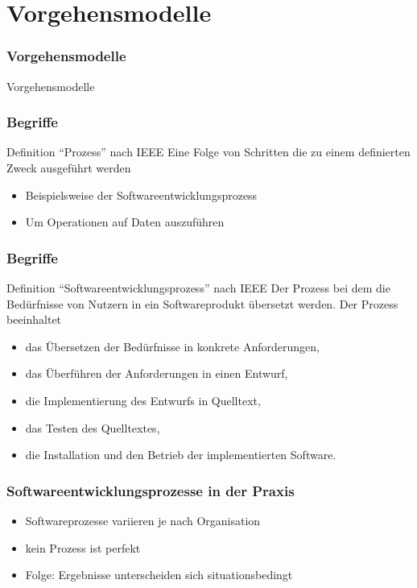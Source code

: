 \section{Vorgehensmodelle}
\begin{frame}[fragile]
\frametitle{Vorgehensmodelle}
\huge Vorgehensmodelle
\end{frame}

\begin{frame}
\frametitle{Begriffe}
	\begin{block}{Definition ``Prozess'' nach IEEE}
		Eine Folge von Schritten die zu einem definierten Zweck ausgeführt werden
		\begin{itemize}
			\item Beispielsweise der Softwareentwicklungsprozess
			\item Um Operationen auf Daten auszuführen
		\end{itemize}
	\end{block}
\end{frame}

\begin{frame}
\frametitle{Begriffe}
	\begin{block}{Definition ``Softwareentwicklungsprozess'' nach IEEE}
		Der Prozess bei dem die Bedürfnisse von Nutzern in ein Softwareprodukt übersetzt werden.
		Der Prozess beeinhaltet
		\begin{itemize}
			\item das Übersetzen der Bedürfnisse in konkrete Anforderungen,
			\item das Überführen der Anforderungen in einen Entwurf,
			\item die Implementierung des Entwurfs in Quelltext,
			\item das Testen des Quelltextes,
			\item die Installation und den Betrieb der implementierten Software.
		\end{itemize}
	\end{block}
\end{frame}

\begin{frame}
\frametitle{Softwareentwicklungsprozesse in der Praxis}
\begin{itemize}
	\item Softwareprozesse variieren je nach Organisation
	\item kein Prozess ist perfekt
	\item Folge: Ergebnisse unterscheiden sich situationsbedingt
\end{itemize}
\end{frame}

